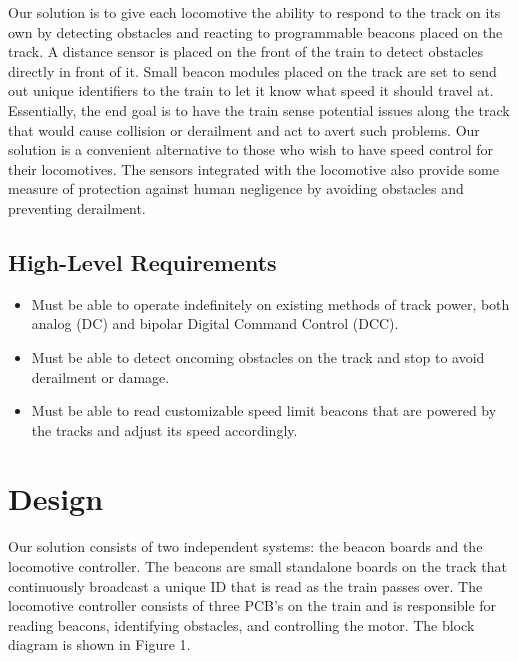 \documentclass[openbib,letterpaper,10pt]{article}
\begin{document}
\begin{spacing}{1.15}
Our solution is to give each locomotive the ability to respond to the track on its own by detecting obstacles and reacting to programmable beacons placed on the track. A distance sensor is placed on the front of the train to detect obstacles directly in front of it. Small beacon modules placed on the track are set to send out unique identifiers to the train to let it know what speed it should travel at. Essentially, the end goal is to have the train sense potential issues along the track that would cause collision or derailment and act to avert such problems. Our solution is a convenient alternative to those who wish to have speed control for their locomotives. The sensors integrated with the locomotive also provide some measure of protection against human negligence by avoiding obstacles and preventing derailment.

\subsection{High-Level Requirements}
\begin{itemize}
\item Must be able to operate indefinitely on existing methods of track power, both analog (DC) and bipolar Digital Command Control (DCC).
\item Must be able to detect oncoming obstacles on the track and stop to avoid derailment or damage.
\item Must be able to read customizable speed limit beacons that are powered by the tracks and adjust its speed accordingly.
\end{itemize}

\clearpage

\section{Design}
Our solution consists of two independent systems: the beacon boards and the locomotive controller. The beacons are small standalone boards on the track that continuously broadcast a unique ID that is read as the train passes over. The locomotive controller consists of three PCB’s on the train and is responsible for reading beacons, identifying obstacles, and controlling the motor. The block diagram is shown in Figure 1.


\end{spacing}
\end{document}
